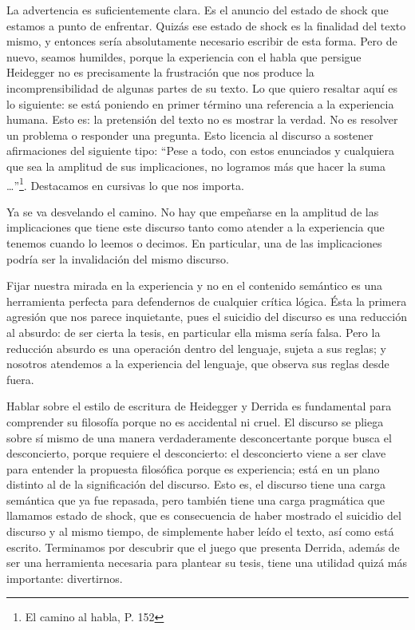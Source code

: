 La advertencia es suficientemente clara. Es
el anuncio del estado de shock que estamos a
punto de enfrentar. Quizás ese estado de
shock es la finalidad del texto mismo, y
entonces sería absolutamente necesario
escribir de esta forma. Pero de nuevo, seamos
humildes, porque la experiencia con el habla
que persigue Heidegger no es precisamente la
frustración que nos produce la
incomprensibilidad de algunas partes de su
texto. Lo que quiero resaltar aquí es lo
siguiente: se está poniendo en primer término
una referencia a la experiencia humana. Esto
es: la pretensión del texto no es mostrar la
verdad. No es resolver un problema o
responder una pregunta. Esto licencia al
discurso a sostener afirmaciones del
siguiente tipo: ``Pese a todo, con estos
enunciados y cualquiera que sea la amplitud
de sus implicaciones, no logramos más que
hacer la suma \ldots{}''\footnote{El camino
al habla, P. 152}. Destacamos en cursivas lo
que nos importa.

Ya se va desvelando el camino. No hay que
empeñarse en la amplitud de las implicaciones
que tiene este discurso tanto como atender a
la experiencia que tenemos cuando lo leemos o
decimos. En particular, una de las
implicaciones podría ser la invalidación del
mismo discurso.

Fijar nuestra mirada en la experiencia y no
en el contenido semántico es una herramienta
perfecta para defendernos de cualquier
crítica lógica. Ésta la primera agresión que
nos parece inquietante, pues el suicidio del
discurso es una reducción al absurdo: de ser
cierta la tesis, en particular ella misma
sería falsa. Pero la reducción absurdo es una
operación dentro del lenguaje, sujeta a sus
reglas; y nosotros atendemos a la experiencia
del lenguaje, que observa sus reglas desde
fuera.

Hablar sobre el estilo de escritura de
Heidegger y Derrida es fundamental para
comprender su filosofía porque no es
accidental ni cruel. El discurso se pliega
sobre sí mismo de una manera verdaderamente
desconcertante porque busca el desconcierto,
porque requiere el desconcierto: el
desconcierto viene a ser clave para entender
la propuesta filosófica porque es
experiencia; está en un plano distinto al de
la significación del discurso. Esto es, el
discurso tiene una carga semántica que ya fue
repasada, pero también tiene una carga
pragmática que llamamos estado de shock, que
es consecuencia de haber mostrado el suicidio
del discurso y al mismo tiempo, de
simplemente haber leído el texto, así como
está escrito. Terminamos por descubrir que el
juego que presenta Derrida, además de ser una
herramienta necesaria para plantear su tesis,
tiene una utilidad quizá más importante:
divertirnos.

